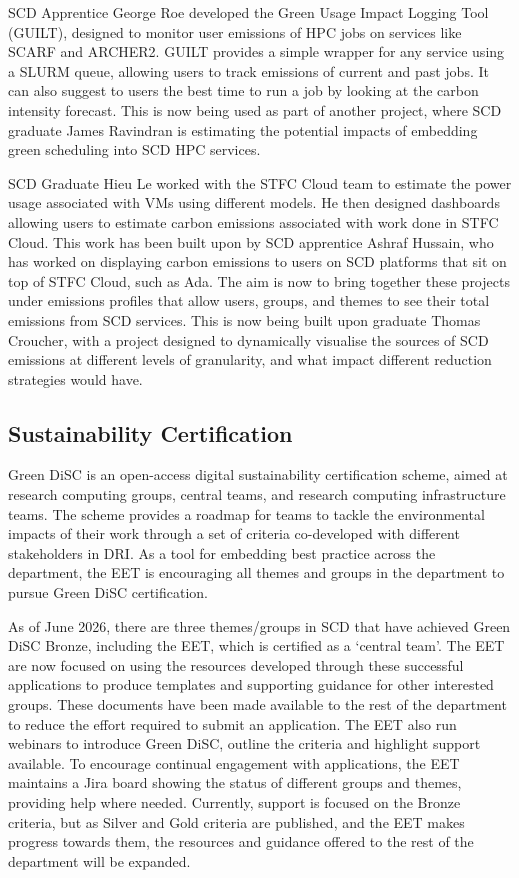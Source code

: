 \documentclass[sigconf]{acmart}
\begin{document}
SCD Apprentice George Roe developed the Green Usage Impact Logging Tool (GUILT), designed to monitor user emissions of HPC jobs on services like SCARF and ARCHER2\cite{GUILT}. GUILT provides a simple wrapper for any service using a SLURM queue\cite{slurm}, allowing users to track emissions of current and past jobs. It can also suggest to users the best time to run a job by looking at the carbon intensity forecast. This is now being used as part of another project, where SCD graduate James Ravindran is estimating the potential impacts of embedding green scheduling into SCD HPC services.

SCD Graduate Hieu Le worked with the STFC Cloud team to estimate the power usage associated with VMs using different models. He then designed dashboards allowing users to estimate carbon emissions associated with work done in STFC Cloud. This work has been built upon by SCD apprentice Ashraf Hussain, who has worked on displaying carbon emissions to users on SCD platforms that sit on top of STFC Cloud, such as Ada. The aim is now to bring together these projects under emissions profiles that allow users, groups, and themes to see their total emissions from SCD services. This is now being built upon graduate Thomas Croucher, with a project designed to dynamically visualise the sources of SCD emissions at different levels of granularity, and what impact different reduction strategies would have.

\subsection{Sustainability Certification}

Green DiSC \cite{GreenDiSC} is an open-access digital sustainability certification scheme, aimed at research computing groups, central teams, and research computing infrastructure teams. The scheme provides a roadmap for teams to tackle the environmental impacts of their work through a set of criteria co-developed with different stakeholders in DRI. As a tool for embedding best practice across the department, the EET is encouraging all themes and groups in the department to pursue Green DiSC certification. 

As of June 2026, there are three themes/groups in SCD that have achieved Green DiSC Bronze, including the EET, which is certified as a ‘central team’. The EET are now focused on using the resources developed through these successful applications to produce templates and supporting guidance for other interested groups. These documents have been made available to the rest of the department to reduce the effort required to submit an application. The EET also run webinars to introduce Green DiSC, outline the criteria and highlight support available. To encourage continual engagement with applications, the EET maintains a Jira board showing the status of different groups and themes, providing help where needed. Currently, support is focused on the Bronze criteria, but as Silver and Gold criteria are published, and the EET makes progress towards them, the resources and guidance offered to the rest of the department will be expanded. 
\end{document}
